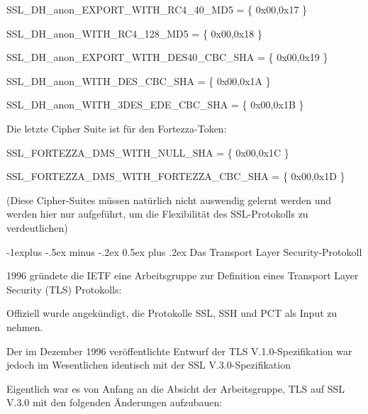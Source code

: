 \documentclass[a4paper]{article}
\makeatletter
\renewcommand{\subsection}{\@startsection{subsection}{2}{0mm}%
 {-1explus -.5ex minus -.2ex}%
 {0.5ex plus .2ex}%
 {\normalfont\normalsize\bfseries}}
\makeatother
\begin{document}
\begin{multicols}{3}
\begin{itemize*}
\begin{itemize*}
                  \begin{itemize*}
                        \item SSL\_DH\_anon\_EXPORT\_WITH\_RC4\_40\_MD5 = \{ 0x00,0x17 \}
                        \item SSL\_DH\_anon\_WITH\_RC4\_128\_MD5 = \{ 0x00,0x18 \}
                        \item SSL\_DH\_anon\_EXPORT\_WITH\_DES40\_CBC\_SHA = \{ 0x00,0x19 \}
                        \item SSL\_DH\_anon\_WITH\_DES\_CBC\_SHA = \{ 0x00,0x1A \}
                        \item SSL\_DH\_anon\_WITH\_3DES\_EDE\_CBC\_SHA = \{ 0x00,0x1B \}
                  \end{itemize*}
                  \item
                  Die letzte Cipher Suite ist für den Fortezza-Token:

                  \begin{itemize*}
                        \item SSL\_FORTEZZA\_DMS\_WITH\_NULL\_SHA = \{ 0x00,0x1C \}
                        \item SSL\_FORTEZZA\_DMS\_WITH\_FORTEZZA\_CBC\_SHA = \{ 0x00,0x1D \}
                  \end{itemize*}
            \end{itemize*}

            (Diese Cipher-Suites müssen natürlich nicht auswendig gelernt werden und
            werden hier nur aufgeführt, um die Flexibilität des SSL-Protokolls zu
            verdeutlichen)


            \subsection{Das Transport Layer
                  Security-Protokoll}

            \begin{itemize*}
                  \item
                  1996 gründete die IETF eine Arbeitsgruppe zur Definition eines
                  Transport Layer Security (TLS) Protokolls:

                  \begin{itemize*}
                        \item Offiziell wurde angekündigt, die Protokolle SSL, SSH und PCT als Input zu nehmen.
                        \item Der im Dezember 1996 veröffentlichte Entwurf der TLS V.1.0-Spezifikation war jedoch im Wesentlichen identisch mit der SSL V.3.0-Spezifikation
                  \end{itemize*}
                  \item
                  Eigentlich war es von Anfang an die Absicht der Arbeitsgruppe, TLS auf
                  SSL V.3.0 mit den folgenden Änderungen aufzubauen:


\end{itemize*}
\end{itemize*}
\end{multicols}
\end{document}
